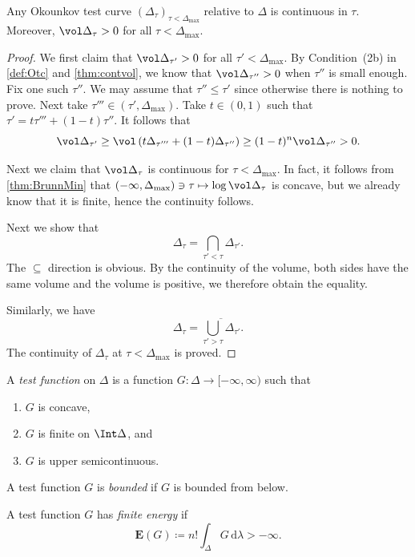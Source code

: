 \begin{proposition}\label{prop:Otccont}
	Any Okounkov test curve $(\Delta_{\tau})_{\tau< \Delta_{\max}}$ relative to $\Delta$ is continuous in $\tau$. Moreover, $\vol \Delta_{\tau}>0$ for all $\tau<\Delta_{\max}$.
\end{proposition}
\begin{proof}
    We first claim that $\vol\Delta_{\tau'}>0$ for all $\tau'<\Delta_{\max}$. By Condition~(2b) in \cref{def:Otc} and \cref{thm:contvol}, we know that $\vol\Delta_{\tau''}>0$ when $\tau''$ is small enough. Fix one such $\tau''$.
    We may assume that $\tau''\leq \tau'$ since otherwise there is nothing to prove. Next take $\tau'''\in (\tau',\Delta_{\max})$. Take $t\in (0,1)$ such that $\tau'=t\tau'''+(1-t)\tau''$. It follows that
    \[
    \vol \Delta_{\tau'}\geq \vol \left( t\Delta_{\tau'''}+(1-t)\Delta_{\tau''}\right)\geq (1-t)^n\vol \Delta_{\tau''}>0.
    \]

	Next we claim that $\vol\Delta_{\tau}$ is continuous for $\tau< \Delta_{\max}$. In fact, it follows from \cref{thm:BrunnMin} that $(-\infty,\Delta_{\max}) \ni \tau\mapsto \log \vol\Delta_{\tau}$ is concave, but we already know that it is finite, hence the continuity follows.

	Next we show that
	\[
		\Delta_{\tau}=\bigcap_{\tau'<\tau}\Delta_{\tau'}.
	\]
	The $\subseteq$ direction is obvious. By the continuity of the volume, both sides have the same volume and the volume is positive, we therefore obtain the equality.

	Similarly, we have
	\[
		\Delta_{\tau}=\overline{\bigcup_{\tau'>\tau}\Delta_{\tau'}}.
	\]
	The continuity of $\Delta_{\tau}$ at $\tau<\Delta_{\max}$ is proved.
\end{proof}

\begin{definition}\label{def:tf}
    A \emph{test function} on $\Delta$ is a function $G\colon \Delta\rightarrow [-\infty,\infty)$ such that
	\begin{enumerate}
		\item\label{itm:def:tf:1} $G$ is concave,
		\item\label{itm:def:tf:2} $G$ is finite on $\Int \Delta$, and
		\item\label{itm:def:tf:3} $G$ is upper semicontinuous.
	\end{enumerate}

    A test function $G$ is \emph{bounded} if $G$ is bounded from below.

    A test function $G$ has \emph{finite energy} if
 \begin{equation}\label{eq:EF}
	\mathbf{E}(G)\coloneqq n!\int_{\Delta} G\,\mathrm{d}\lambda>-\infty.
\end{equation}
\end{definition}

